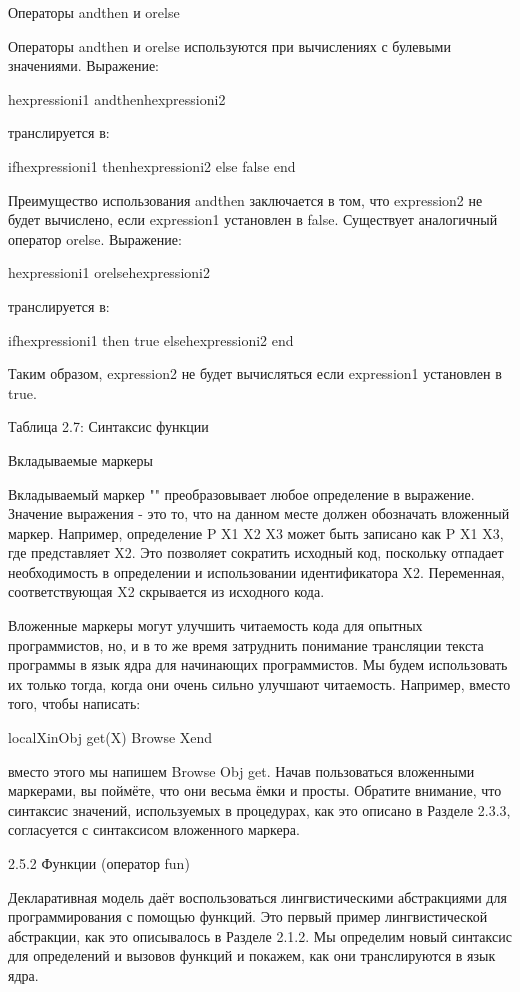Операторы andthen и orelse

Операторы andthen и orelse используются при вычислениях с булевыми значениями. Выражение:

hexpressioni1 andthenhexpressioni2

транслируется в:

ifhexpressioni1 thenhexpressioni2 else false end

Преимущество использования andthen заключается в том, что expression2 не будет вычислено, если expression1 установлен в false. Существует аналогичный оператор orelse. Выражение:

hexpressioni1 orelsehexpressioni2

транслируется в:

ifhexpressioni1 then true elsehexpressioni2 end

Таким образом, expression2 не будет вычисляться если expression1 установлен в true.

Таблица 2.7: Синтаксис функции

Вкладываемые маркеры

Вкладываемый маркер "" преобразовывает любое определение в выражение. Значение выражения - это то, что на данном месте должен обозначать вложенный маркер. Например, определение {P X1 X2 X3} может быть записано как {P X1 X3}, где  представляет X2. Это позволяет сократить исходный код, поскольку отпадает необходимость в определении и использовании идентификатора X2. Переменная, соответствующая X2 скрывается из исходного кода.

Вложенные маркеры могут улучшить читаемость кода для опытных программистов, но, и в то же время затруднить понимание трансляции текста программы в язык ядра для начинающих программистов. Мы будем использовать их только тогда, когда они очень сильно улучшают читаемость. Например, вместо того, чтобы написать:

localXin{Obj get(X)} {Browse X}end

вместо этого мы напишем {Browse {Obj get{}}}. Начав пользоваться вложенными маркерами, вы поймёте, что они весьма ёмки и просты. Обратите внимание, что синтаксис значений, используемых в процедурах, как это описано в Разделе 2.3.3, согласуется с синтаксисом вложенного маркера.

2.5.2 Функции (оператор fun)

Декларативная модель даёт воспользоваться лингвистическими абстракциями для программирования с помощью функций. Это первый пример лингвистической абстракции, как это описывалось в Разделе 2.1.2. Мы определим новый синтаксис для определений и вызовов функций и покажем, как они транслируются в язык ядра.

